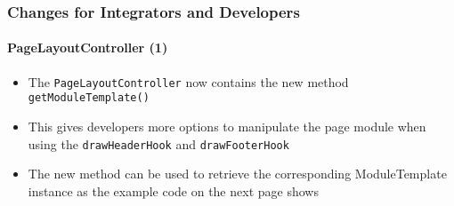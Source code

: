 %

\begin{frame}[fragile]
	\frametitle{Changes for Integrators and Developers}
	\framesubtitle{PageLayoutController (1)}

	\begin{itemize}
		\item The \texttt{PageLayoutController} now contains the new method\newline
			\texttt{getModuleTemplate()}
		\item This gives developers more options to manipulate the page module
			when using the \texttt{drawHeaderHook} and \texttt{drawFooterHook}
		\item The new method can be used to retrieve the corresponding ModuleTemplate
			instance as the example code on the next page shows
	\end{itemize}

\end{frame}

